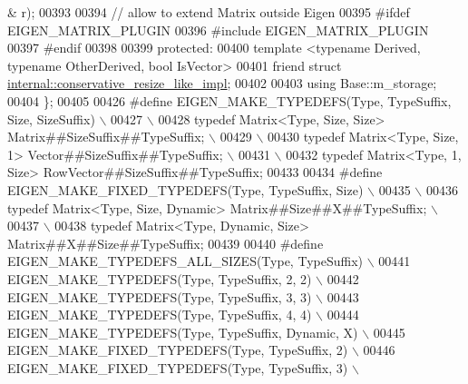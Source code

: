 \begin{DoxyCode}
      & r);
00393 
00394     \textcolor{comment}{// allow to extend Matrix outside Eigen}
00395 \textcolor{preprocessor}{    #ifdef EIGEN\_MATRIX\_PLUGIN}
00396 \textcolor{preprocessor}{    #include EIGEN\_MATRIX\_PLUGIN}
00397 \textcolor{preprocessor}{    #endif}
00398 
00399   \textcolor{keyword}{protected}:
00400     \textcolor{keyword}{template} <\textcolor{keyword}{typename} Derived, \textcolor{keyword}{typename} OtherDerived, \textcolor{keywordtype}{bool} IsVector>
00401     \textcolor{keyword}{friend} \textcolor{keyword}{struct }\hyperlink{struct_eigen_1_1internal_1_1conservative__resize__like__impl}{internal::conservative\_resize\_like\_impl};
00402 
00403     \textcolor{keyword}{using} Base::m\_storage;
00404 \};
00405 
00426 \textcolor{preprocessor}{#define EIGEN\_MAKE\_TYPEDEFS(Type, TypeSuffix, Size, SizeSuffix)   \(\backslash\)}
00427 \textcolor{preprocessor}{                                    \(\backslash\)}
00428 \textcolor{preprocessor}{typedef Matrix<Type, Size, Size> Matrix##SizeSuffix##TypeSuffix;  \(\backslash\)}
00429 \textcolor{preprocessor}{                                    \(\backslash\)}
00430 \textcolor{preprocessor}{typedef Matrix<Type, Size, 1>    Vector##SizeSuffix##TypeSuffix;  \(\backslash\)}
00431 \textcolor{preprocessor}{                                    \(\backslash\)}
00432 \textcolor{preprocessor}{typedef Matrix<Type, 1, Size>    RowVector##SizeSuffix##TypeSuffix;}
00433 
00434 \textcolor{preprocessor}{#define EIGEN\_MAKE\_FIXED\_TYPEDEFS(Type, TypeSuffix, Size)         \(\backslash\)}
00435 \textcolor{preprocessor}{                                    \(\backslash\)}
00436 \textcolor{preprocessor}{typedef Matrix<Type, Size, Dynamic> Matrix##Size##X##TypeSuffix;  \(\backslash\)}
00437 \textcolor{preprocessor}{                                    \(\backslash\)}
00438 \textcolor{preprocessor}{typedef Matrix<Type, Dynamic, Size> Matrix##X##Size##TypeSuffix;}
00439 
00440 \textcolor{preprocessor}{#define EIGEN\_MAKE\_TYPEDEFS\_ALL\_SIZES(Type, TypeSuffix) \(\backslash\)}
00441 \textcolor{preprocessor}{EIGEN\_MAKE\_TYPEDEFS(Type, TypeSuffix, 2, 2) \(\backslash\)}
00442 \textcolor{preprocessor}{EIGEN\_MAKE\_TYPEDEFS(Type, TypeSuffix, 3, 3) \(\backslash\)}
00443 \textcolor{preprocessor}{EIGEN\_MAKE\_TYPEDEFS(Type, TypeSuffix, 4, 4) \(\backslash\)}
00444 \textcolor{preprocessor}{EIGEN\_MAKE\_TYPEDEFS(Type, TypeSuffix, Dynamic, X) \(\backslash\)}
00445 \textcolor{preprocessor}{EIGEN\_MAKE\_FIXED\_TYPEDEFS(Type, TypeSuffix, 2) \(\backslash\)}
00446 \textcolor{preprocessor}{EIGEN\_MAKE\_FIXED\_TYPEDEFS(Type, TypeSuffix, 3) \(\backslash\)}

\end{DoxyCode}
